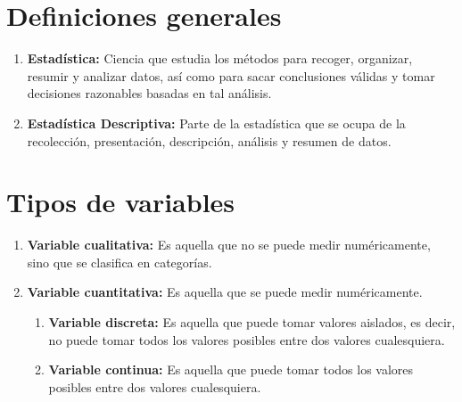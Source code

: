 \documentclass{templateNote}
\begin{document}
\portada
\margenes %

\section{Definiciones generales}
\begin{enumerate}
    \item \textbf{Estadística:} Ciencia que estudia los métodos para recoger, organizar, resumir y analizar datos, así como para sacar conclusiones válidas y tomar decisiones razonables basadas en tal análisis.\\
    \item \textbf{Estadística Descriptiva:} Parte de la estadística que se ocupa de la recolección, presentación, descripción, análisis y resumen de datos.\\
\end{enumerate}
\section{Tipos de variables}
\begin{enumerate}
    \item \textbf{Variable cualitativa:} Es aquella que no se puede medir numéricamente, sino que se clasifica en categorías.\\
    \item \textbf{Variable cuantitativa:} Es aquella que se puede medir numéricamente.\\
    \begin{enumerate}
        \item \textbf{Variable discreta:} Es aquella que puede tomar valores aislados, es decir, no puede tomar todos los valores posibles entre dos valores cualesquiera.\\
        \item \textbf{Variable continua:} Es aquella que puede tomar todos los valores posibles entre dos valores cualesquiera.\\
    \end{enumerate}
\end{enumerate}
\end{document}
